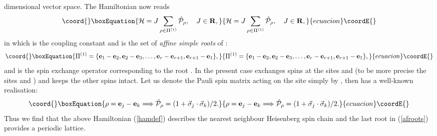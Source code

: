 \documentclass[a4paper,12pt]{article}
\begin{document}
dimensional vector space.
The Hamiltonian now reads
\begin{equation}\coord{}\boxEquation{
{\cal H}=J\sum_{\rho\in\Pi^{(1)}}\hat{\cal P}_\rho,\quad J\in{\bf R},
\label{hamdef}
}{
{\cal H}=J\sum_{\rho\in\Pi^{(1)}}\hat{\cal P}_\rho,\quad J\in{\bf R},
}{ecuacion}\coordE{}\end{equation}
in which \coordHE{} is the coupling constant and \coordHE{}
is the set of {\em affine
simple roots\/} of \coordHE{}:
\begin{equation}\coord{}\boxEquation{
\Pi^{(1)}=\{{\bf e}_1-{\bf e}_2,{\bf e}_2-{\bf e}_3,\ldots,
{\bf e}_r-{\bf e}_{r+1},
{\bf e}_{r+1}-{\bf e}_1\},
\label{afroots}
}{
\Pi^{(1)}=\{{\bf e}_1-{\bf e}_2,{\bf e}_2-{\bf e}_3,\ldots,
{\bf e}_r-{\bf e}_{r+1},
{\bf e}_{r+1}-{\bf e}_1\},
}{ecuacion}\coordE{}\end{equation}
and \coordHE{} is the spin exchange operator
corresponding to the root
\myHighlight{$\rho$}\coordHE{}.
In the present case \coordHE{}
exchanges spins at the
sites \coordHE{} and \coordHE{} (to be more precise the sites \coordHE{} and
\coordHE{})
and keeps the other spins intact. Let us denote the Pauli spin
matrix acting on the
site \coordHE{} simply by \coordHE{}, then  \coordHE{} has a
well-known realisation:
\begin{equation}\coord{}\boxEquation{
\rho={\bf e}_j-{\bf e}_k\Longrightarrow
\hat{\cal P}_\rho=(1+\vec{\sigma}_j\cdot\vec{\sigma}_k)/2.
\label{Pdef1}
}{
\rho={\bf e}_j-{\bf e}_k\Longrightarrow
\hat{\cal P}_\rho=(1+\vec{\sigma}_j\cdot\vec{\sigma}_k)/2.
}{ecuacion}\coordE{}\end{equation}
Thus we find that the above Hamiltonian  (\ref{hamdef}) describes the
nearest
neighbour Heisenberg spin chain and the last root in (\ref{afroots})
provides
a periodic lattice.
\end{document}
